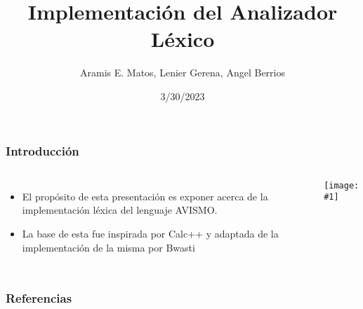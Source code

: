 \documentclass[14pt, aspectratio=169]{beamer}
\title{Implementación del Analizador Léxico}
\author{Aramis E. Matos, Lenier Gerena, Angel Berrios}
\date{3/30/2023}
\newcommand {\scaledimage}[1] {
    \texttt{[image: \#1]}
}
\begin{document}
\maketitle

\begin{frame}
    \frametitle{Introducción}
    \begin{columns}
        \small
        \begin{itemize}
            \item El propósito de esta presentación es exponer acerca de la implementación léxica del lenguaje AVISMO.
            \item La base de esta fue inspirada por Calc++ \cite{noauthor_complete_nodate} y adaptada de la implementación de la misma por Bwasti \cite{wasti_bwastibison-example-calc-_2020}
        \end{itemize}
        \scaledimage{chemical.png}
    \end{columns}
\end{frame}


\begin{frame}
    \frametitle{Referencias}
    
    
\end{frame}
\end{document}
